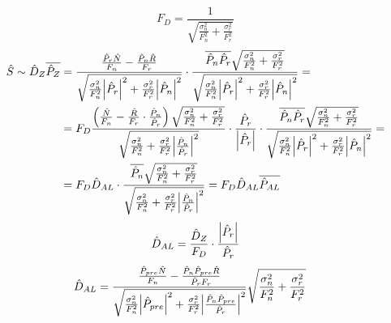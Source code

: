 \begin{equation}
F_D = \frac{1}{\sqrt{\frac{\sigma_n^2}{F_n^2} + \frac{\sigma_r^2}{F_r^2}}}
\end{equation}
%
\begin{align}
  \hat{S} \sim \hat{D}_Z\overline{\hat{P}_Z} &= \frac
  {\frac{\hat{P}_r\hat{N}}{F_n} - \frac{\hat{P}_n\hat{R}}{F_r}}
  {\sqrt{\frac{\sigma_n^2}{F_n^2}\abs{\hat{P}_r}^2 +
      \frac{\sigma_r^2}{F_r^2}\abs{\hat{P}_n}^2}}
  \cdot
  \frac{\overline{\hat{P}_n\hat{P}_r}\sqrt{\frac{\sigma_n^2}{F_n^2} + \frac{\sigma_r^2}{F_r^2}}}
  {\sqrt{\frac{\sigma_n^2}{F_n^2}\abs{\hat{P}_r}^2 +
      \frac{\sigma_r^2}{F_r^2}\abs{\hat{P}_n}^2}} = \label{eq:DzPz}\\
 &= F_D \frac
  {\left(\frac{\hat{N}}{F_n} -  \frac{\hat{R}}{F_r} \cdot
    \frac{\hat{P}_n}{\hat{P}_r}\right) \sqrt{\frac{\sigma_n^2}{F_n^2} + \frac{\sigma_r^2}{F_r^2}} }
  {\sqrt{\frac{\sigma_n^2}{F_n^2} +
      \frac{\sigma_r^2}{F_r^2}\abs{\frac{\hat{P}_n}{\hat{P}_r}}^2}}
  \cdot
  \frac{\hat{P}_r}{\abs{\hat{P}_r}}
  \cdot
  \frac{\overline{\hat{P}_n\hat{P}_r}\sqrt{\frac{\sigma_n^2}{F_n^2} + \frac{\sigma_r^2}{F_r^2}}}
  {\sqrt{\frac{\sigma_n^2}{F_n^2}\abs{\hat{P}_r}^2 +
      \frac{\sigma_r^2}{F_r^2}\abs{\hat{P}_n}^2}} = \\
  &= F_D \hat{D}_{AL} \cdot \frac{\overline{\hat{P}_n}
  \sqrt{\frac{\sigma_n^2}{F_n^2} + \frac{\sigma_r^2}{F_r^2}}}
  {\sqrt{\frac{\sigma_n^2}{F_n^2} +
      \frac{\sigma_r^2}{F_r^2}\abs{\frac{\hat{P}_n}{\hat{P}_r}}^2}} =
F_D \hat{D}_{AL}\overline{\hat{P}_{AL}}
\label{eq:DalDzPrPr}
\end{align}
%
\begin{equation}
\hat{D}_{AL} = \frac{\hat{D}_Z}{F_D}\cdot\frac{\abs{\hat{P}_r}}{\hat{P}_r}
\end{equation}
%
\begin{align}
  \hat{D}_{AL} &= \frac
  {\frac{\hat{P}_{pre}\hat{N}}{F_n} -
    \frac{\hat{P}_n\hat{P}_{pre}\hat{R}}{\hat{P}_r F_r} }
  {\sqrt{\frac{\sigma_n^2}{F_n^2}\abs{\hat{P}_{pre}}^2 +
      \frac{\sigma_r^2}{F_r^2}\abs{\frac{\hat{P}_n\hat{P}_{pre}}{\hat{P}_r}}^2}}
  \sqrt{\frac{\sigma_n^2}{F_n^2} + \frac{\sigma_r^2}{F_r^2}}
                 \label{eq:DalPre}
\end{align}
%
